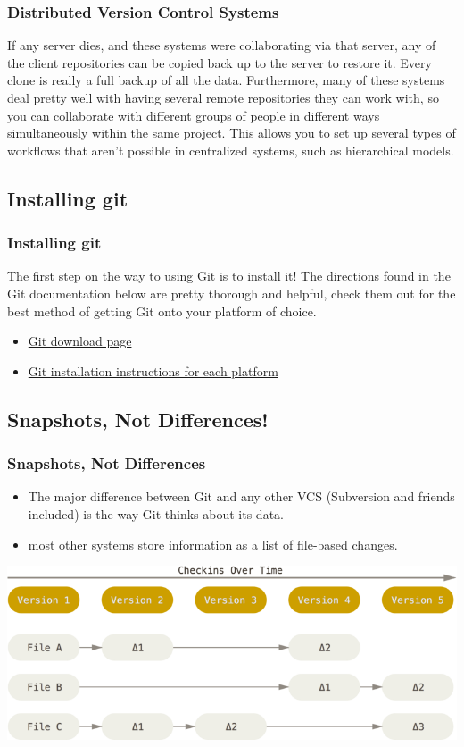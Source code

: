 \begin{frame}
  \frametitle{Distributed Version Control Systems}
   If any server dies, and these systems were collaborating via that server, any of the client repositories can be copied back up to the server to restore it. Every clone is really a full backup of all the data.
   Furthermore, many of these systems deal pretty well with having several remote repositories they can work with, so you can collaborate with different groups of people in different ways simultaneously within the same project. This allows you to set up several types of workflows that aren’t possible in centralized systems, such as hierarchical models.
\end{frame}

\subsection{Installing git}

\begin{frame}
\frametitle{Installing git}
The first step on the way to using Git is to install it! The directions found in the Git documentation below are pretty thorough and helpful, check them out for the best method of getting Git onto your platform of choice.

 \begin{itemize}
   \item \href{https://git-scm.com/downloads}{Git download page}
   \item \href{https://git-scm.com/book/en/v2/Getting-Started-Installing-Git}{Git installation instructions for each platform}
  \end{itemize}

\end{frame}

\subsection{Snapshots, Not Differences!}

\begin{frame}
  \frametitle{Snapshots, Not Differences}
  \begin{itemize}
   \item The major difference between Git and any other VCS (Subversion and friends included) is the way Git thinks about its data.
   \item most other systems store information as a list of file-based changes. 
  \end{itemize}
  
    \vspace{1em}
  \begin{center}
    \includegraphics[width=0.8\linewidth]{figures/deltas}
  \end{center}
\end{frame}

